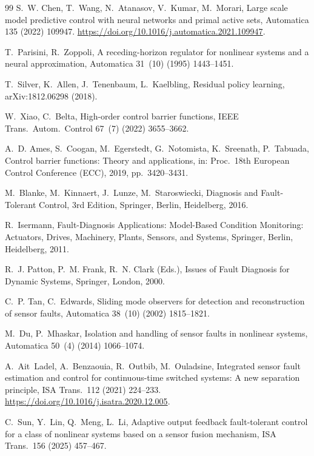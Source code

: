 \documentclass[preprint,12pt,authoryear=false]{elsarticle}
\theoremstyle{remark}\newtheorem{remark}{Remark}
\theoremstyle{plain}\newtheorem{proposition}{Proposition}\newtheorem{lemma}{Lemma}
\theoremstyle{definition}\newtheorem{assumption}{Assumption}
\begin{document}
\begin{thebibliography}{99}
S.~W. Chen, T.~Wang, N.~Atanasov, V.~Kumar, M.~Morari,
Large scale model predictive control with neural networks and primal active sets,
Automatica 135 (2022) 109947.
\url{https://doi.org/10.1016/j.automatica.2021.109947}.

T.~Parisini, R.~Zoppoli,
A receding-horizon regulator for nonlinear systems and a neural approximation,
Automatica 31~(10) (1995) 1443--1451.

T.~Silver, K.~Allen, J.~Tenenbaum, L.~Kaelbling,
Residual policy learning,
arXiv:1812.06298 (2018).

W.~Xiao, C.~Belta,
High-order control barrier functions,
IEEE Trans.\ Autom.\ Control 67~(7) (2022) 3655--3662.

A.~D. Ames, S.~Coogan, M.~Egerstedt, G.~Notomista, K.~Sreenath, P.~Tabuada,
Control barrier functions: Theory and applications,
in: Proc.\ 18th European Control Conference (ECC), 2019, pp.~3420--3431.

M.~Blanke, M.~Kinnaert, J.~Lunze, M.~Staroswiecki,
Diagnosis and Fault-Tolerant Control,
3rd Edition, Springer, Berlin, Heidelberg, 2016.

R.~Isermann,
Fault-Diagnosis Applications: Model-Based Condition Monitoring: Actuators, Drives, Machinery, Plants, Sensors, and Systems,
Springer, Berlin, Heidelberg, 2011.

R.~J. Patton, P.~M. Frank, R.~N. Clark (Eds.),
Issues of Fault Diagnosis for Dynamic Systems,
Springer, London, 2000.

C.~P. Tan, C.~Edwards,
Sliding mode observers for detection and reconstruction of sensor faults,
Automatica 38~(10) (2002) 1815--1821.

M.~Du, P.~Mhaskar,
Isolation and handling of sensor faults in nonlinear systems,
Automatica 50~(4) (2014) 1066--1074.

A.~Ait~Ladel, A.~Benzaouia, R.~Outbib, M.~Ouladsine,
Integrated sensor fault estimation and control for continuous-time switched systems: A new separation principle,
ISA Trans.\ 112 (2021) 224--233.
\url{https://doi.org/10.1016/j.isatra.2020.12.005}.

C.~Sun, Y.~Lin, Q.~Meng, L.~Li,
Adaptive output feedback fault-tolerant control for a class of nonlinear systems based on a sensor fusion mechanism,
ISA Trans.\ 156 (2025) 457--467.


\end{thebibliography}
\end{document}
